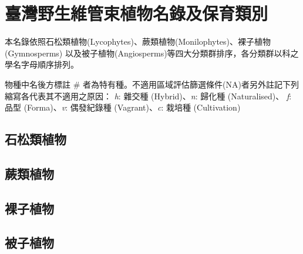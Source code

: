 \chapter{臺灣野生維管束植物名錄及保育類別}

\begin{small}
\linespread{1.5}\selectfont
本名錄依照石松類植物(Lycophytes)、蕨類植物(Monilophytes)、裸子植物(Gymnosperms)
以及被子植物(Angiosperms)等四大分類群排序，各分類群以科之學名字母順序排列。

\noindent 物種中名後方標註 \# 者為特有種。不適用區域評估篩選條件(NA)者另外註記下列縮寫各代表其不適用之原因：
\textit{h}: 雜交種 (Hybrid)、\textit{n}: 歸化種 (Naturalised)、
\textit{f}: 品型 (Forma)、\textit{v}: 偶發紀錄種 (Vagrant)、\textit{c}: 栽培種 (Cultivation) \\
\end{small}

\begin{flushleft}
    \begin{multicols}{2}
    \linespread{1}\selectfont
    \section{石松類植物}
    
    \section{蕨類植物}
    
    \section{裸子植物}
    
    \section{被子植物}
    
    \end{multicols}
\end{flushleft}
